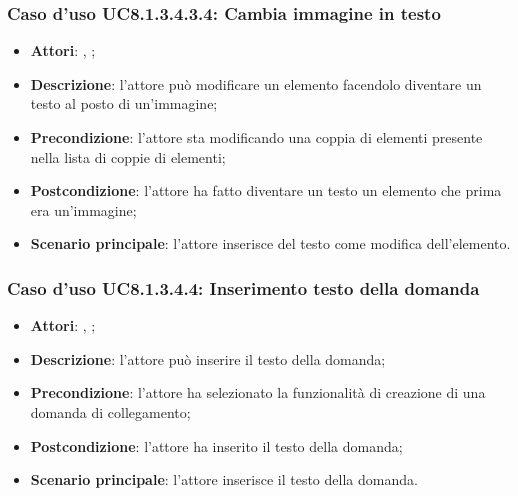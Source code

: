 		\subsubsection{Caso d'uso UC8.1.3.4.3.4: Cambia immagine in testo}
		\label{UC8.1.3.4.3.4}
		\begin{itemize}
			\item \textbf{Attori}: \uau, \uaupro;
			\item \textbf{Descrizione}: l'attore può modificare un elemento facendolo diventare un testo al posto di un'immagine;
			\item \textbf{Precondizione}: l'attore sta modificando una coppia di elementi presente nella lista di coppie di elementi; 
			\item \textbf{Postcondizione}: l'attore ha fatto diventare un testo un elemento che prima era un'immagine;
			\item \textbf{Scenario principale}: l'attore inserisce del testo come modifica dell'elemento.  
		\end{itemize}
		
	\subsubsection{Caso d'uso UC8.1.3.4.4: Inserimento testo della domanda}
	\begin{itemize}
		\item
		\textbf{Attori}: \uau, \uaupro;
		\item		
		\textbf{Descrizione}: l'attore può inserire il testo della domanda;
		\item
		\textbf{Precondizione}: l'attore ha selezionato la funzionalità di creazione di una domanda di collegamento;
		\item \textbf{Postcondizione}: l'attore ha inserito il testo della domanda;
		\item \textbf{Scenario principale}: l'attore inserisce il testo della domanda. 
	\end{itemize}